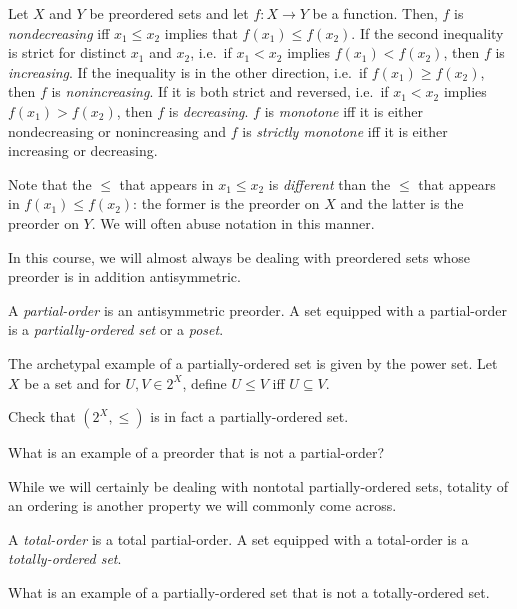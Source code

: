 \begin{dfn}[Monotone]\label{dfnA.1.21}
Let $X$ and $Y$ be preordered sets and let $f:X\rightarrow Y$ be a function.  Then, $f$ is \emph{nondecreasing} iff $x_1\leq x_2$ implies that $f(x_1)\leq f(x_2)$.  If the second inequality is strict for distinct $x_1$ and $x_2$, i.e.~if $x_1<x_2$ implies $f(x_1)<f(x_2)$, then $f$ is \emph{increasing}.  If the inequality is in the other direction, i.e.~if $f(x_1)\geq f(x_2)$, then $f$ is \emph{nonincreasing}.  If it is both strict and reversed, i.e.~if $x_1<x_2$ implies $f(x_1)>f(x_2)$, then $f$ is \emph{decreasing}.  $f$ is \emph{monotone} iff it is either nondecreasing or nonincreasing and $f$ is \emph{strictly monotone} iff it is either increasing or decreasing.
\begin{rmk}
Note that the $\leq$ that appears in $x_1\leq x_2$ is \emph{different} than the $\leq$ that appears in $f(x_1)\leq f(x_2)$:  the former is the preorder on $X$ and the latter is the preorder on $Y$.  We will often abuse notation in this manner.
\end{rmk}
\end{dfn}

In this course, we will almost always be dealing with preordered sets whose preorder is in addition antisymmetric.
\begin{dfn}\label{dfnA.1.24}
A \emph{partial-order} is an antisymmetric preorder.  A set equipped with a partial-order is a \emph{partially-ordered set} or a \emph{poset}.
\end{dfn}
\begin{exm}
The archetypal example of a partially-ordered set is given by the power set.  Let $X$ be a set and for $U,V\in 2^X$, define $U\leq V$ iff $U\subseteq V$.
\begin{exr}\label{exrA.1.26}
Check that $(2^X,\leq )$ is in fact a partially-ordered set.
\end{exr}
\end{exm}
\begin{exr}
What is an example of a preorder that is not a partial-order?
\end{exr}

While we will certainly be dealing with nontotal partially-ordered sets, totality of an ordering is another property we will commonly come across.
\begin{dfn}
A \emph{total-order} is a total partial-order.  A set equipped with a total-order is a \emph{totally-ordered set}.
\end{dfn}
\begin{exr}
What is an example of a partially-ordered set that is not a totally-ordered set.
\end{exr}

